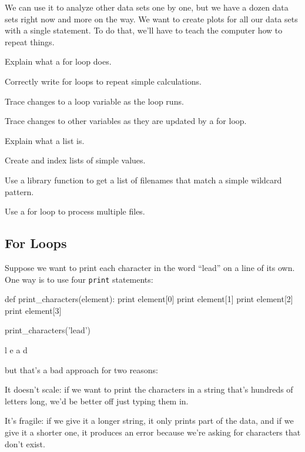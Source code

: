 We can use it to analyze other data sets one by one,
but we have a dozen data sets right now and more on the way. We want to
create plots for all our data sets with a single statement. To do that,
we'll have to teach the computer how to repeat things.

\begin{objectives}
\begin{swcitemize}
\item
  Explain what a for loop does.
\item
  Correctly write for loops to repeat simple calculations.
\item
  Trace changes to a loop variable as the loop runs.
\item
  Trace changes to other variables as they are updated by a for loop.
\item
  Explain what a list is.
\item
  Create and index lists of simple values.
\item
  Use a library function to get a list of filenames that match a simple
  wildcard pattern.
\item
  Use a for loop to process multiple files.
\end{swcitemize}
\end{objectives}

\subsection{For Loops}

Suppose we want to print each character in the word ``lead'' on a line
of its own. One way is to use four \texttt{print} statements:

\begin{VerbIn}
def print_characters(element):
    print element[0]
    print element[1]
    print element[2]
    print element[3]

print_characters('lead')
\end{VerbIn}

\begin{VerbOut}
l
e
a
d
\end{VerbOut}

but that's a bad approach for two reasons:

\begin{swcenumerate}
\item
  It doesn't scale: if we want to print the characters in a string
  that's hundreds of letters long, we'd be better off just typing them
  in.
\item
  It's fragile: if we give it a longer string, it only prints part of
  the data, and if we give it a shorter one, it produces an error
  because we're asking for characters that don't exist.
\end{swcenumerate}

